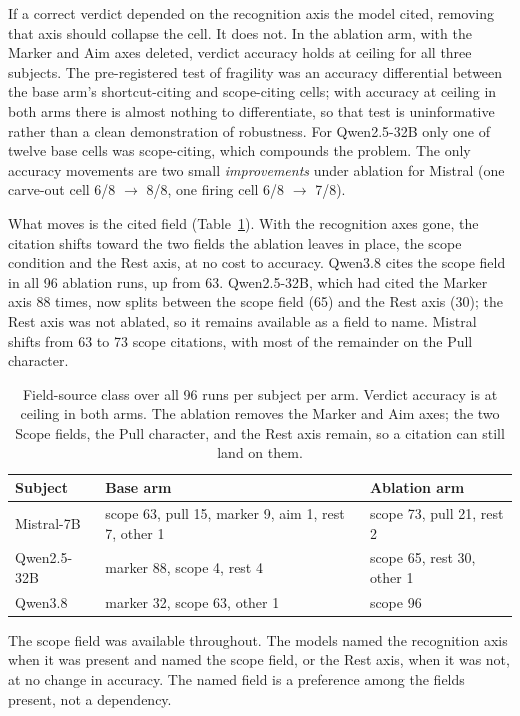 \documentclass[11pt,a4paper]{article}
\begin{document}
If a correct verdict depended on the recognition axis the model cited, removing
that axis should collapse the cell. It does not. In the ablation arm, with the
Marker and Aim axes deleted, verdict accuracy holds at ceiling for all three
subjects. The pre-registered test of fragility was an accuracy differential
between the base arm's shortcut-citing and scope-citing cells; with accuracy at
ceiling in both arms there is almost nothing to differentiate, so that test is
uninformative rather than a clean demonstration of robustness. For Qwen2.5-32B
only one of twelve base cells was scope-citing, which compounds the problem. The
only accuracy movements are two small \emph{improvements} under ablation for
Mistral (one carve-out cell 6/8 $\rightarrow$ 8/8, one firing cell 6/8
$\rightarrow$ 7/8).

What moves is the cited field (Table~\ref{tab:h2}). With the recognition axes
gone, the citation shifts toward the two fields the ablation leaves in place, the
scope condition and the Rest axis, at no cost to accuracy. Qwen3.8 cites the scope
field in all 96 ablation runs, up from 63. Qwen2.5-32B, which had cited the Marker
axis 88 times, now splits between the scope field (65) and the Rest axis (30); the
Rest axis was not ablated, so it remains available as a field to name. Mistral
shifts from 63 to 73 scope citations, with most of the remainder on the Pull
character.

\begin{table}[h]
\centering
\small
\caption{Field-source class over all 96 runs per subject per arm. Verdict
accuracy is at ceiling in both arms. The ablation removes the Marker and Aim
axes; the two Scope fields, the Pull character, and the Rest axis remain, so a
citation can still land on them.}
\label{tab:h2}
\begin{tabular}{@{}lll@{}}
\toprule
Subject & Base arm & Ablation arm \\
\midrule
Mistral-7B & scope 63, pull 15, marker 9, aim 1, rest 7, other 1 & scope 73, pull 21, rest 2 \\
Qwen2.5-32B & marker 88, scope 4, rest 4 & scope 65, rest 30, other 1 \\
Qwen3.8 & marker 32, scope 63, other 1 & scope 96 \\
\bottomrule
\end{tabular}
\end{table}

The scope field was available throughout. The models named the recognition axis
when it was present and named the scope field, or the Rest axis, when it was not,
at no change in accuracy. The named field is a preference among the fields
present, not a dependency.
\end{document}
